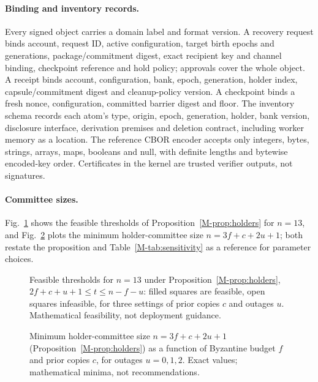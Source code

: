 \documentclass[pdflatex,sn-mathphys-num]{sn-jnl}
\begin{document}
\paragraph{Binding and inventory records.}
Every signed object carries a domain label and format version. A recovery request binds account, request ID, active configuration, target birth epochs and generations, package/commitment digest, exact recipient key and channel binding, checkpoint reference and hold policy; approvals cover the whole object. A receipt binds account, configuration, bank, epoch, generation, holder index, capsule/commitment digest and cleanup-policy version. A checkpoint binds a fresh nonce, configuration, committed barrier digest and floor. The inventory schema records each atom's type, origin, epoch, generation, holder, bank version, disclosure interface, derivation premises and deletion contract, including worker memory as a location. The reference CBOR encoder accepts only integers, bytes, strings, arrays, maps, booleans and null, with definite lengths and bytewise encoded-key order. Certificates in the kernel are trusted verifier outputs, not signatures.

\paragraph{Committee sizes.}
Fig.~\ref{fig:feasible} shows the feasible thresholds of Proposition~\ref{M-prop:holders} for $n=13$, and Fig.~\ref{fig:minholders} plots the minimum holder-committee size $n=3f+c+2u+1$; both restate the proposition and Table~\ref{M-tab:sensitivity} as a reference for parameter choices.

\begin{figure}[htbp]
\centering
\figbox{}
\caption{Feasible thresholds for $n=13$ under Proposition~\ref{M-prop:holders}, $2f+c+u+1\le t\le n-f-u$: filled squares are feasible, open squares infeasible, for three settings of prior copies $c$ and outages $u$. Mathematical feasibility, not deployment guidance.}\label{fig:feasible}
\end{figure}

\begin{figure}[htbp]
\centering
\figbox{}
\caption{Minimum holder-committee size $n=3f+c+2u+1$ (Proposition~\ref{M-prop:holders}) as a function of Byzantine budget $f$ and prior copies $c$, for outages $u=0,1,2$. Exact values; mathematical minima, not recommendations.}\label{fig:minholders}
\end{figure}
\end{document}
